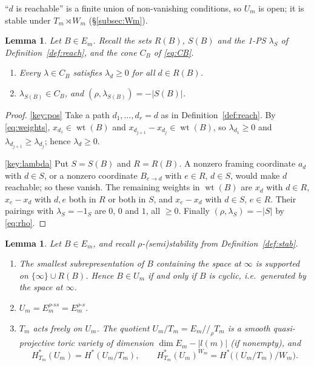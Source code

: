 \documentclass[11pt]{amsart}
\newtheorem{lemma}[theorem]{Lemma}
\theoremstyle{definition}
\theoremstyle{remark}
\numberwithin{equation}{section}
\DeclareMathOperator{\wt}{wt}
\begin{document}
``$d$ is reachable'' is a finite union of non-vanishing conditions, so $U_m$ is open; it is stable under
$T_m\rtimes W_m$ (\S\ref{subsec:Wm}).

\begin{lemma}\label{lem:key}
Let $B\in E_m$. Recall the sets $R(B)$, $S(B)$ and the 1-PS $\lambda_S$ of
Definition~\ref{def:reach}, and the cone $C_B$ of \eqref{eq:CB}.
\begin{enumerate}[label=(\arabic*),leftmargin=2em]
\item\label{key:pos} Every $\lambda\in C_B$ satisfies $\lambda_d\ge0$ for all $d\in R(B)$.
\item\label{key:lambda} $\lambda_{S(B)}\in C_B$, and $(\rho,\lambda_{S(B)})=-|S(B)|$.
\end{enumerate}
\end{lemma}

\begin{proof}
\ref{key:pos} Take a path $d_1,\dots,d_r=d$ as in Definition~\ref{def:reach}. By \eqref{eq:weights},
$x_{d_1}\in\wt(B)$ and $x_{d_{j+1}}-x_{d_j}\in\wt(B)$, so $\lambda_{d_1}\ge0$ and
$\lambda_{d_{j+1}}\ge\lambda_{d_j}$; hence $\lambda_d\ge0$.

\ref{key:lambda} Put $S=S(B)$ and $R=R(B)$. A nonzero framing coordinate $a_d$ with $d\in S$, or a nonzero
coordinate $B_{e\to d}$ with $e\in R$, $d\in S$, would make $d$ reachable; so these vanish. The remaining
weights in $\wt(B)$ are $x_d$ with $d\in R$, $x_e-x_d$ with $d,e$ both in $R$ or both in $S$, and
$x_e-x_d$ with $d\in S$, $e\in R$. Their pairings with $\lambda_S=-1_S$ are $0$, $0$ and $1$, all
$\ge0$. Finally $(\rho,\lambda_S)=-|S|$ by \eqref{eq:rho}.
\end{proof}

\begin{lemma}\label{lem:Um}
Let $B\in E_m$, and recall $\rho$-(semi)stability from Definition~\ref{def:stab}.
\begin{enumerate}[label=(\arabic*),leftmargin=2em]
\item\label{Um:cyclic} The smallest subrepresentation of $B$ containing the space at $\infty$ is
supported on $\{\infty\}\cup R(B)$. Hence $B\in U_m$ if and only if $B$ is cyclic, i.e.\ generated by
the space at $\infty$.
\item\label{Um:ss} $U_m=E_m^{\rho\text{-}ss}=E_m^{\rho\text{-}s}$.
\item\label{Um:free} $T_m$ acts freely on $U_m$. The quotient $U_m/T_m=E_m/\!/_\rho T_m$ is a smooth
quasi-projective toric variety of dimension $\dim E_m-|l(m)|$ (if nonempty), and
\[
  H^*_{T_m}(U_m)=H^*(U_m/T_m),\qquad H^*_{T_m}(U_m)^{W_m}=H^*\big((U_m/T_m)/W_m\big).
\]
\end{enumerate}
\end{lemma}
\end{document}
